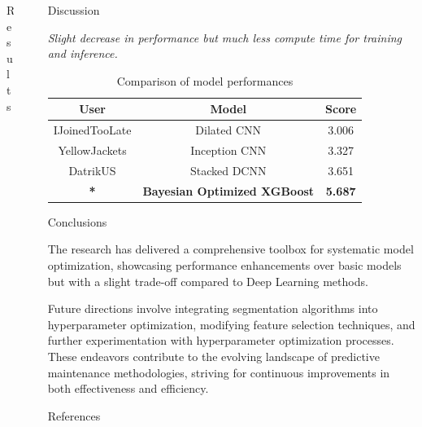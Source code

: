 \documentclass[final, 12pt]{beamer}
\newlength{\sepwidth}
\newlength{\colwidth}
\newlength{\smallcolwidth}
\newlength{\bigcolwidth}
\newcommand{\separatorcolumn}{\begin{column}{\sepwidth}\end{column}}
\begin{document}
\begin{frame}[t]
\begin{columns}[t]
\begin{column}{\bigcolwidth}
\begin{block}{Results}
    \end{block}

\end{column}

\separatorcolumn

\begin{column}{\smallcolwidth}

    \begin{block}{Discussion}

        \textit{Slight decrease in performance but much less compute time for training and inference.}
        \begin{table}
            \centering
            \begin{tabular}{ ccc }
                \toprule
                User & Model & Score \\
                \midrule
                IJoinedTooLate \cite{phm2021-1st-cnn} & Dilated CNN & 3.006 \\
                YellowJackets \cite{phm2021-2nd-inception} & Inception CNN & 3.327 \\
                DatrikUS \cite{phm2021-3rd-stacked-cnn} & Stacked DCNN & 3.651 \\
                \textbf{*} & \textbf{Bayesian Optimized XGBoost} & \textbf{5.687} \\
                \bottomrule
            \end{tabular}
            \caption{Comparison of model performances}
        \end{table}

    \end{block}

    \begin{block}{Conclusions}

        The research has delivered a comprehensive toolbox for systematic model optimization, showcasing performance enhancements over basic models but with a slight trade-off compared to Deep Learning methods.

        Future directions involve integrating segmentation algorithms into hyperparameter optimization, modifying feature selection techniques, and further experimentation with hyperparameter optimization processes. These endeavors contribute to the evolving landscape of predictive maintenance methodologies, striving for continuous improvements in both effectiveness and efficiency.

    \end{block}


    \begin{block}{References}


\end{block}
\end{column}
\end{columns}
\end{frame}
\end{document}
